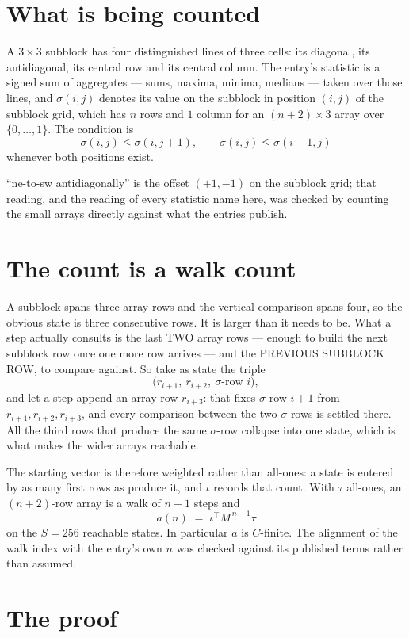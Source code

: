 \documentclass[11pt,a4paper]{article}
\theoremstyle{plain}
\theoremstyle{definition}
\begin{document}
\section{What is being counted}

A $3\times3$ subblock has four distinguished lines of three cells: its diagonal, its
antidiagonal, its central row and its central column. The entry's statistic is a signed sum of
aggregates --- sums, maxima, minima, medians --- taken over those lines, and $\sigma(i,j)$
denotes its value on the subblock in position $(i,j)$ of the subblock grid, which has $n$ rows
and $1$ column for an $(n+2)\times3$ array over $\{0,\dots,1\}$. The condition is
\[
\sigma(i,j)\le\sigma(i,j+1),\qquad \sigma(i,j)\le\sigma(i+1,j)
\]
whenever both positions exist.

``ne-to-sw antidiagonally'' is the offset $(+1,-1)$ on the subblock grid; that reading, and
the reading of every statistic name here, was checked by counting the small arrays directly
against what the entries publish.

\section{The count is a walk count}

A subblock spans three array rows and the vertical comparison spans four, so the obvious state
is three consecutive rows. It is larger than it needs to be. What a step actually consults is
the last TWO array rows --- enough to build the next subblock row once one more row arrives ---
and the PREVIOUS SUBBLOCK ROW, to compare against. So take as state the triple
\[
\bigl(r_{i+1},\ r_{i+2},\ \sigma\text{-row }i\bigr),
\]
and let a step append an array row $r_{i+3}$: that fixes $\sigma$-row $i+1$ from
$r_{i+1},r_{i+2},r_{i+3}$, and every comparison between the two $\sigma$-rows is settled
there. All the third rows that produce the same $\sigma$-row collapse into one state, which is
what makes the wider arrays reachable.

The starting vector is therefore weighted rather than all-ones: a state is entered by as many
first rows as produce it, and $\iota$ records that count. With $\tau$ all-ones, an
$(n+2)$-row array is a walk of $n-1$ steps and
\[
a(n)\;=\;\iota^{\!\top}M^{\,n-1}\tau
\]
on the $S=256$ reachable states. In particular $a$ is $C$-finite. The alignment of the walk
index with the entry's own $n$ was checked against its published terms rather than assumed.

\section{The proof}
\end{document}
